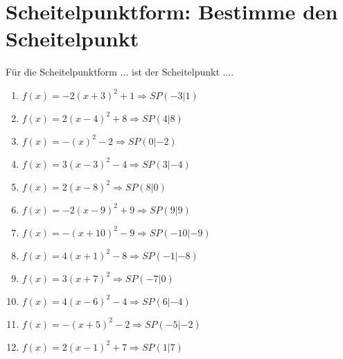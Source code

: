 \documentclass{article}%
\begin{document}
\section{Scheitelpunktform: Bestimme den Scheitelpunkt}%
\label{sec:ScheitelpunktformBestimmedenScheitelpunkt}%
Für die Scheitelpunktform ... ist der Scheitelpunkt ....%
\begin{enumerate}[label=\alph*)]%
\item%
\newline\vspace{0.5cm}$f(x)=-2(x+3)^2 +1 \Rightarrow SP(-3|1) $%
\item%
\newline\vspace{0.5cm}$f(x)=2(x-4)^2 +8 \Rightarrow SP(4|8) $%
\item%
\newline\vspace{0.5cm}$f(x)=-(x)^2 -2 \Rightarrow SP(0|-2) $%
\item%
\newline\vspace{0.5cm}$f(x)=3(x-3)^2 -4 \Rightarrow SP(3|-4) $%
\item%
\newline\vspace{0.5cm}$f(x)=2(x-8)^2 \Rightarrow SP(8|0) $%
\item%
\newline\vspace{0.5cm}$f(x)=-2(x-9)^2 +9 \Rightarrow SP(9|9) $%
\item%
\newline\vspace{0.5cm}$f(x)=-(x+10)^2 -9 \Rightarrow SP(-10|-9) $%
\item%
\newline\vspace{0.5cm}$f(x)=4(x+1)^2 -8 \Rightarrow SP(-1|-8) $%
\item%
\newline\vspace{0.5cm}$f(x)=3(x+7)^2 \Rightarrow SP(-7|0) $%
\item%
\newline\vspace{0.5cm}$f(x)=4(x-6)^2 -4 \Rightarrow SP(6|-4) $%
\item%
\newline\vspace{0.5cm}$f(x)=-(x+5)^2 -2 \Rightarrow SP(-5|-2) $%
\item%
\newline\vspace{0.5cm}$f(x)=2(x-1)^2 +7 \Rightarrow SP(1|7) $%

\end{enumerate}
\end{document}

